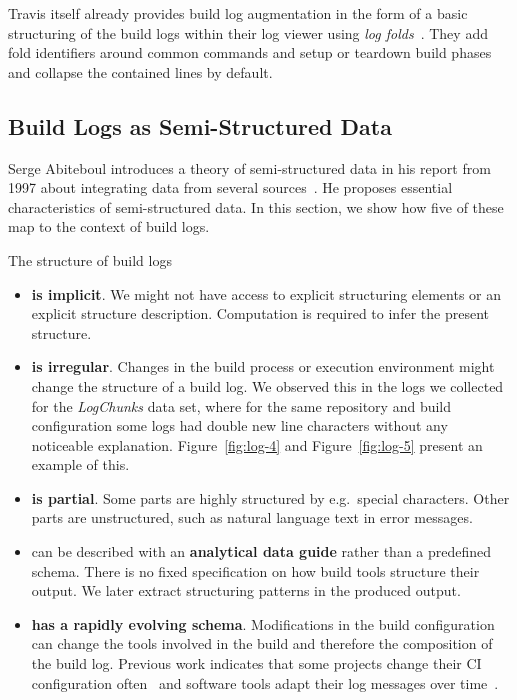 \documentclass[\myrootdir/main.tex]{subfiles}
\begin{document}
Travis itself already provides build log augmentation in the form of a basic structuring of the build logs within their log viewer using \emph{log folds}~\cite{travis2019logfolds}.
They add fold identifiers around common commands and setup or teardown build phases and collapse the contained lines by default.

\subsection{Build Logs as Semi-Structured Data}
\label{sec:rw-semi-structured-data}
Serge Abiteboul introduces a theory of semi-structured data in his report from 1997 about integrating data from several sources~\cite{abiteboul1997querying}.
He proposes essential characteristics of semi-structured data.
In this section, we show how five of these map to the context of build logs.

The structure of build logs
\begin{itemize}
  \item \textbf{is implicit}.
  We might not have access to explicit structuring elements or an explicit structure description.
  Computation is required to infer the present structure.
  \item \textbf{is irregular}.
  Changes in the build process or execution environment might change the structure of a build log.
  We observed this in the logs we collected for the \emph{LogChunks} data set, where for the same repository and build configuration some logs had double new line characters without any noticeable explanation.
  Figure~\ref{fig:log-4} and Figure~\ref{fig:log-5} present an example of this.
  \item \textbf{is partial}. Some parts are highly structured by e.g.\ special characters. Other parts are unstructured, such as natural language text in error messages.
  \item can be described with an \textbf{analytical data guide} rather than a predefined schema.
  There is no fixed specification on how build tools structure their output.
  We later extract structuring patterns in the produced output.
  \item \textbf{has a rapidly evolving schema}.
  Modifications in the build configuration can change the tools involved in the build and therefore the composition of the build log.
  Previous work indicates that some projects change their CI configuration often~\cite{hilton2016usage} and software tools adapt their log messages over time~\cite{yuan2012characterizing}.
\end{itemize}
\end{document}
